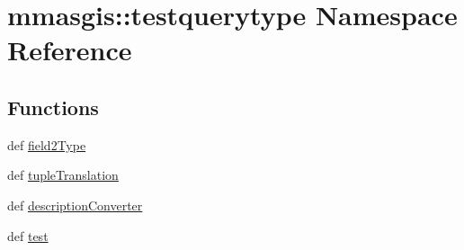 \hypertarget{namespacemmasgis_1_1testquerytype}{
\section{mmasgis::testquerytype Namespace Reference}
\label{namespacemmasgis_1_1testquerytype}
}
\subsection*{Functions}
\begin{DoxyCompactItemize}
\item 
def \hyperlink{namespacemmasgis_1_1testquerytype_a2f482d9b6e0f70da4d9472c97b636f26}{field2Type}
\item 
def \hyperlink{namespacemmasgis_1_1testquerytype_a3e7a76663bda71c8d2ff7d58297c25a2}{tupleTranslation}
\item 
def \hyperlink{namespacemmasgis_1_1testquerytype_a11d0973b49d800b782ea43e88d4577ec}{descriptionConverter}
\item 
def \hyperlink{namespacemmasgis_1_1testquerytype_ab47581c5c5544e1f4a28e9185a308060}{test}
\end{DoxyCompactItemize}
